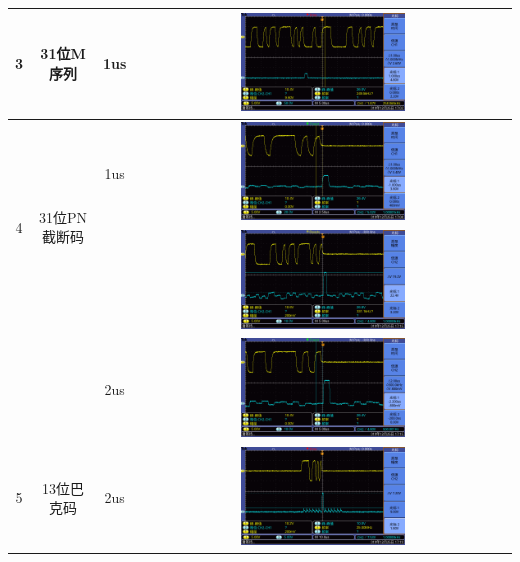 \documentclass[12pt]{article}
\begin{document}
\begin{longtable}{|c|c|c|c|}
    \hline
3 & 31位M序列 & 1us & \includegraphics[width=0.45\textwidth]{data/new/F0029TEK}\\
    \hline
    \multirow{2}[4]{*}{4} & \multirow{2}[4]{*}{31位PN截断码} & 1us & \includegraphics[width=0.45\textwidth]{data/new/F0032TEK} \\
    &&&\includegraphics[width=0.45\textwidth]{data/new/F0033TEK}\\
\cline{3-4}      &   & 2us & \includegraphics[width=0.45\textwidth]{data/new/F0034TEK} \\
    \hline
5  & 13位巴克码  & 2us & \includegraphics[width=0.45\textwidth]{data/new/F0037TEK}  \\

\end{longtable}
\end{document}
